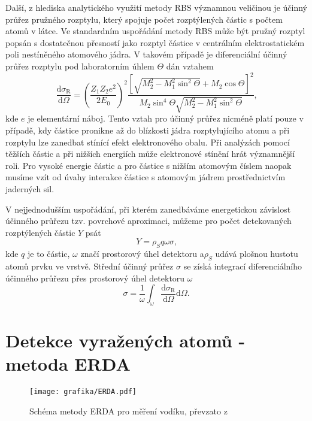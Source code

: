 Další, z hlediska analytického využití metody RBS významnou veličinou je účinný průřez pružného rozptylu, který spojuje počet rozptýlených částic s počtem atomů v látce. Ve standardním uspořádání metody RBS může být pružný rozptyl popsán s dostatečnou přesností jako rozptyl částice v centrálním elektrostatickém poli nestíněného atomového jádra. V takovém případě je diferenciální účinný průřez rozptylu pod laboratorním úhlem $\Theta$ dán vztahem
\begin{equation}
\frac{\mathrm{d}\sigma_\mathrm{R}}{\mathrm{d}\Omega} = 
\left( \frac{Z_1 Z_2 e^2}{2 E_0} \right)^2
 \frac{ \left[ \sqrt{M_2^2 - M_1^2\sin^2\Theta} + M_2 \cos\Theta \right]^2 }{M_2 \sin^4 \Theta \sqrt{M_2^2 - M_1^2\sin^2\Theta}}  \text{,}
\end{equation}
kde $e$ je elementární náboj. Tento vztah pro účinný průřez nicméně platí pouze v případě, kdy částice pronikne až do blízkosti jádra rozptylujícího atomu a při rozptylu lze zanedbat stínící efekt elektronového obalu. Při analýzách pomocí těžších částic a při nižších energiích může elektronové stínění hrát významnější roli. Pro vysoké energie částic a pro částice s nižším atomovým číslem naopak musíme vzít od úvahy interakce částice s atomovým jádrem prostřednictvím jaderných sil.

V nejjednodušším uspořádání, při kterém zanedbáváme energetickou závislost účinného průřezu tzv. povrchové aproximaci, můžeme pro počet detekovaných rozptýlených částic $Y$ psát
\begin{equation}
Y = \rho_S q \omega \sigma \text{,}
\end{equation}
kde $q$ je to částic, $\omega$ značí prostorový úhel detektoru a$ \rho_S$ udává plošnou hustotu atomů prvku ve vrstvě. Střední účinný průřez $\sigma$ se získá integrací diferenciálního účinného průřezu přes prostorový úhel detektoru $\omega$
\begin{equation}
\sigma = \frac{1}{\omega} \int_\omega \frac{\mathrm{d}\sigma_\mathrm{R}}{\mathrm{d}\Omega} \mathrm{d}\Omega \text{.}
\end{equation}




\section{Detekce vyražených atomů - metoda ERDA}
\begin{figure}[bthp]
  \centering
  \texttt{[image: grafika/ERDA.pdf]}
  \caption{Schéma metody ERDA pro měření vodíku, převzato z \cite{Kral2002}}
  \label{ERDA}
\end{figure}

